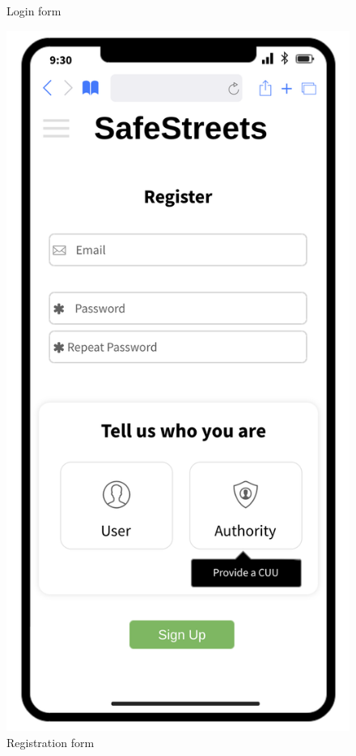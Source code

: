\begin{figure}[H]
\begin{minipage}[b]{0.40\textwidth}
		\caption{Login form}
	\end{minipage}
	\hfill
	\begin{minipage}[b]{0.40\textwidth}
		\includegraphics[width=\textwidth]{Images/dd-mocks/registration.png}
		\caption{Registration form}
	\end{minipage}
\end{figure}


